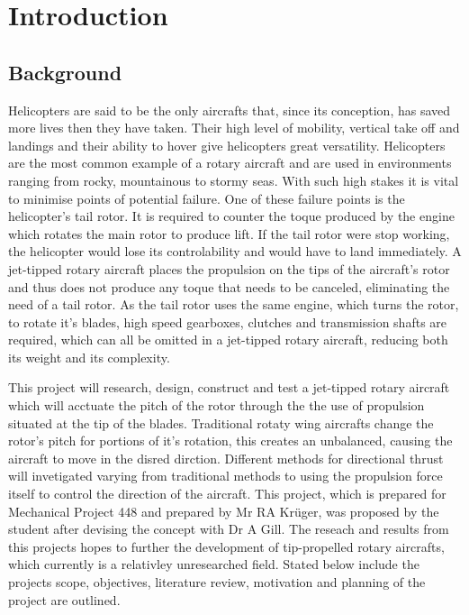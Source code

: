 \chapter{Introduction}

\section{Background}

    Helicopters are said to be the only aircrafts that, since its conception, has saved more lives then they have taken. Their  high level of mobility, vertical take off and landings and their ability to hover give helicopters great versatility. Helicopters are the most common example of a rotary aircraft and are used in environments ranging from rocky, mountainous to stormy seas. With such high stakes it is vital to minimise points of potential failure. One of these failure points is the helicopter's tail rotor. It is required to counter the toque produced by the engine which rotates the main rotor to produce lift. If the tail rotor were stop working, the helicopter would lose its controlability and would have to land immediately. A jet-tipped rotary aircraft places the propulsion on the tips of the aircraft's rotor and thus does not produce any toque that needs to be canceled, eliminating the need of a tail rotor. As the tail rotor uses the same engine, which turns the rotor, to rotate it's blades, high speed gearboxes, clutches and transmission shafts are required, which can all be omitted in a jet-tipped rotary aircraft, reducing both its weight and its complexity.

    \vspace{3mm}
    This project will research, design, construct and test a jet-tipped rotary aircraft which will acctuate the pitch of the rotor through the the use of propulsion situated at the tip of the blades. Traditional rotaty wing aircrafts change the rotor's pitch for portions of it's rotation, this creates an unbalanced, causing the aircraft to move in the disred dirction. Different methods for directional thrust will invetigated varying from traditional methods to using the propulsion force itself to control the direction of the aircraft. 
    \vspace*{3mm}
    This project, which is prepared for Mechanical Project 448 and prepared by Mr RA Krüger, was proposed by the student after devising the concept with Dr A Gill. The reseach and results from this projects hopes to further the development of tip-propelled rotary aircrafts, which currently is a relativley unresearched field.    Stated below include the projects scope, objectives, literature review, motivation and planning of the project are outlined. 

